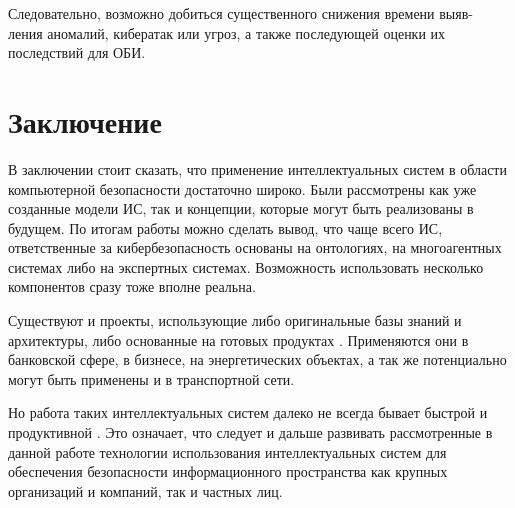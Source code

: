Следовательно, возможно добиться существенного снижения времени выяв-
ления аномалий, кибератак или угроз, а также последующей оценки их последствий
для ОБИ.
\newpage
\section{Заключение}
В заключении стоит сказать, что применение интеллектуальных систем в области компьютерной безопасности
достаточно широко. Были рассмотрены как уже созданные модели ИС, так и концепции, которые могут
быть реализованы в будущем. По итогам работы можно сделать вывод, что чаще всего ИС, ответственные за
кибербезопасность основаны на онтологиях, на многоагентных системах либо на экспертных системах.
Возможность использовать несколько компонентов сразу тоже вполне реальна.

Существуют и проекты, использующие либо оригинальные базы знаний и архитектуры, либо основанные на
готовых продуктах \cite{concept, wars}. Применяются они в банковской
сфере, в бизнесе, на энергетических объектах, а так же потенциально могут быть применены и в транспортной сети.

Но работа таких интеллектуальных систем далеко не всегда бывает быстрой и продуктивной \cite{mob, upg}. Это означает,
что следует и дальше развивать рассмотренные в данной работе технологии использования интеллектуальных
систем для обеспечения безопасности информационного пространства как крупных организаций и компаний, так
и частных лиц.
\newpage

